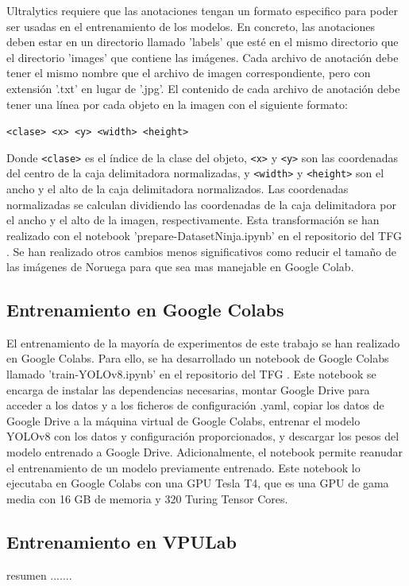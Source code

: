Ultralytics requiere que las anotaciones tengan un formato especifico para poder ser usadas en el entrenamiento de los modelos. En concreto, las anotaciones deben estar en un directorio llamado 'labels' que esté en el mismo directorio que el directorio 'images' que contiene las imágenes. Cada archivo de anotación debe tener el mismo nombre que el archivo de imagen correspondiente, pero con extensión '.txt' en lugar de '.jpg'. El contenido de cada archivo de anotación debe tener una línea por cada objeto en la imagen con el siguiente formato:
\begin{center}
    \texttt{<clase> <x> <y> <width> <height>}
\end{center}
Donde \texttt{<clase>} es el índice de la clase del objeto, \texttt{<x>} y \texttt{<y>} son las coordenadas del centro de la caja delimitadora normalizadas, y \texttt{<width>} y \texttt{<height>} son el ancho y el alto de la caja delimitadora normalizados. Las coordenadas normalizadas se calculan dividiendo las coordenadas de la caja delimitadora por el ancho y el alto de la imagen, respectivamente. Esta transformación se han realizado con el notebook 'prepare-DatasetNinja.ipynb' en el repositorio del TFG \cite{TFG_Repository}. Se han realizado otros cambios menos significativos como reducir el tamaño de las imágenes de Noruega para que sea mas manejable en Google Colab.

\subsection{Entrenamiento en Google Colabs}
El entrenamiento de la mayoría de experimentos de este trabajo se han realizado en Google Colabs. Para ello, se ha desarrollado un notebook de Google Colabs llamado 'train-YOLOv8.ipynb' en el repositorio del TFG \cite{TFG_Repository}. Este notebook se encarga de instalar las dependencias necesarias, montar Google Drive para acceder a los datos y a los ficheros de configuración .yaml, copiar los datos de Google Drive a la máquina virtual de Google Colabs, entrenar el modelo YOLOv8 con los datos y configuración proporcionados, y descargar los pesos del modelo entrenado a Google Drive. Adicionalmente, el notebook permite reanudar el entrenamiento de un modelo previamente entrenado. Este notebook lo ejecutaba en Google Colabs con una GPU Tesla T4, que es una GPU de gama media con 16 GB de memoria y 320 Turing Tensor Cores.

\subsection{Entrenamiento en VPULab}
resumen .......


